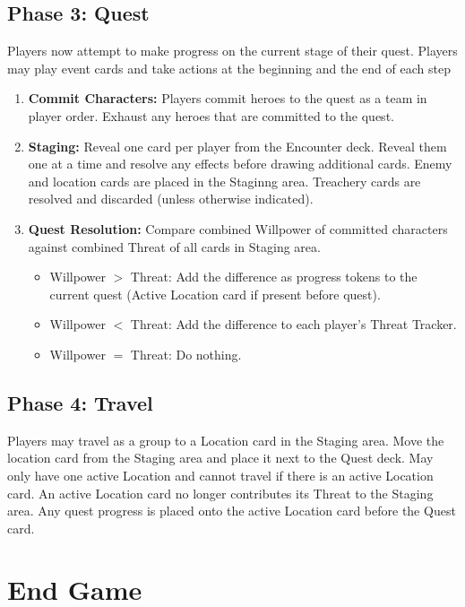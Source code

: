 \documentclass[12pt]{article}
\newenvironment{enumerateCustom}
{\begin{enumerate}
  \setlength{\itemsep}{1pt}
  \setlength{\parskip}{0pt}
  \setlength{\parsep}{0pt}}
{\end{enumerate}}
\newenvironment{itemizeCustom}
{\begin{itemize}
  \setlength{\itemsep}{1pt}
  \setlength{\parskip}{0pt}
  \setlength{\parsep}{0pt}}
{\end{itemize}}
\begin{document}
\begin{mdframed}[style = customFrame]
\begin{multicols*}{2}
\subsection*{Phase 3: Quest}
Players now attempt to make progress on the current stage of their quest. Players may play event cards and take actions at the beginning and the end of each step
\begin{enumerateCustom}
	\item \textbf{Commit Characters:} Players commit heroes to the quest as a team in player order. Exhaust any heroes that are committed to the quest.
	\item \textbf{Staging:}  Reveal one card per player from the Encounter deck. Reveal them one at a time and resolve any effects before drawing additional cards. Enemy and location cards are placed in the Staginng area. Treachery cards are resolved and discarded (unless otherwise indicated).
	\item \textbf{Quest Resolution:} Compare combined Willpower of committed characters against combined Threat of all cards in Staging area.
		\begin{itemizeCustom}
			\item Willpower $>$ Threat: Add the difference as progress tokens to the current quest (Active Location card if present before quest).
			\item Willpower $<$ Threat: Add the difference to each player's Threat Tracker.
			\item Willpower $=$ Threat: Do nothing.
		\end{itemizeCustom}
\end{enumerateCustom}

\subsection*{Phase 4: Travel}
Players may travel as a group to a Location card in the Staging area. Move the location card from the Staging area and place it next to the Quest deck. May only have one active Location and cannot travel if there is an active Location card. An active Location card no longer contributes its Threat to the Staging area. Any quest progress is placed onto the active Location card before the Quest card.

\section*{End Game}

\end{multicols*}
\end{mdframed}
\end{document}
